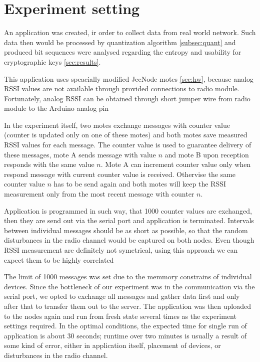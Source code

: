 \documentclass[
  print, %
  table,   %
  nolof,     %
  nolot,     %
           oneside
]{fithesis3}
\begin{document}
  \section{Experiment setting}
  An application was created, ir order to collect data from real world network. Such data then would be processed by quantization algorithm \ref{subsec:quant} and produced bit sequences were analysed regarding the entropy and usability for cryptographic keys \ref{sec:results}.

  This application uses speacially modified JeeNode motes \ref{sec:hw}, because analog RSSI values are not available through provided connections to radio module. Fortunately, analog RSSI can be obtained through short jumper wire from radio module to the Arduino analog pin %

  In the experiment itself, two motes exchange messages with counter value (counter is updated only on one of these motes) and both motes save measured RSSI values for each message. The counter value is used to guarantee delivery of these messages, mote A sends message with value $n$ and mote B upon reception responds with the same value $n$. Mote A can increment counter value only when respond message with current counter value is received. Othervise the same counter value $n$ has to be send again and both motes will keep the RSSI measurement only from the most recent message with counter $n$.

  Application is programmed in such way, that 1000 counter values are exchanged, then they are send out via the serial port and application is terminated. Intervals between individual messages should be as short as possible, so that the random disturbances in the radio channel would be captured on both nodes. Even though RSSI measurement are definitely not symetrical, using this approach we can expect them to be highly correlated %

  The limit of 1000 messages was set due to the memmory constrains of individual devices. Since the bottleneck of our experiment was in the communication via the serial port, we opted to exchange all messages and gather data first and only after that to transfer them out to the server. The application was then uploaded to the nodes again and run from fresh state several times as the experiment settings required. In the optimal conditions, the expected time for single run of application is about 30 seconds; runtime over two minutes is usually a result of some kind of error, either in application itself, placement of devices, or disturbances in the radio channel.
\end{document}
